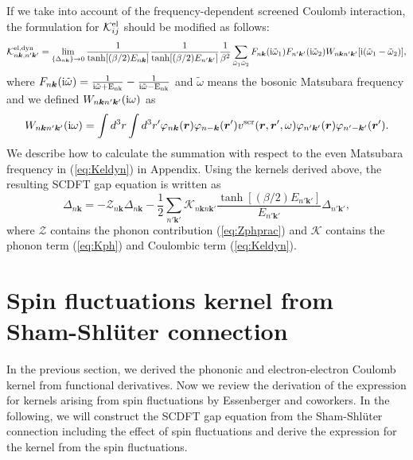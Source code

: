 %
If we take into account of the frequency-dependent screened Coulomb interaction,
the formulation for ${\mathcal K}^{\rm el}_{ij}$ should be modified as follows\cite{ra2013}:
%
\begin{equation}
	{\mathcal K}^{\rm el, dyn}_{n\bm k,n'\bm k'} = 
	\lim_{\{\Delta_{n\bm k}\} \to 0}
	\frac{1}{\tanh[(\beta/2)E_{n\bm k}]}\frac{1}{\tanh[(\beta/2)E_{n'\bm k'}]}
	\frac{1}{\beta^2}
	\sum_{\tilde{\omega}_1\tilde{\omega}_2}
	F_{n\bm k}({\rm i}\tilde\omega_1)F_{n'\bm k'}({\rm i}\tilde\omega_2)
	W_{n\bm kn'\bm k'}[{\rm i}(\tilde\omega_1 - \tilde\omega_2)],
	\label{eq:Keldyn}
\end{equation}
%
where $F_{n\bm k}({\rm i}\tilde\omega) = 
\frac{1}{\rm i \tilde\omega + E_{n\bm k}}-\frac{1}{\rm i \tilde\omega - E_{n\bm k}}$
and $\tilde\omega$ means the bosonic Matsubara frequency and we defined 
$W_{n\bm kn'\bm k'}({\rm i}\omega)$ as 
%
\begin{equation}
	W_{n\bm kn'\bm k'}({\rm i}\omega) = 
	\int d^3r \int d^3r' \varphi_{n\bm k}(\bm r)\varphi_{n-\bm k}({\bm r'})
	v^{\rm scr}(\bm r, {\bm r'}, \omega) \varphi_{n'\bm k'}(\bm r) \varphi_{n'-\bm k'}({\bm r'}).
	\label{eq:dynWnknk}
\end{equation}
%
We describe how to calculate the summation with respect to the even Matsubara frequency in (\ref{eq:Keldyn})
in Appendix.
Using the kernels derived above, the resulting SCDFT gap equation is written as
%
\begin{equation}
	\Delta_{n\bm k} = -{\mathcal Z}_{n \bm k}\Delta_{n\bm k} - \frac{1}{2}
	\sum_{n'\bm k'}{\mathcal K}_{n\bm k n \bm k'}
	\frac{\tanh[(\beta/2)E_{n' \bm k'}]}{E_{n' \bm k'}}\Delta_{n' \bm k'},
	\label{eq:truegapeq}
\end{equation}
%
where $\mathcal Z$ contains the phonon contribution (\ref{eq:Zphprac}) and $\mathcal K$ contains 
the phonon term (\ref{eq:Kph}) and Coulombic term (\ref{eq:Keldyn}).
\section{Spin fluctuations kernel from Sham-Shl\"{u}ter connection}
In the previous section, we derived the phononic and 
electron-electron Coulomb kernel from functional derivatives.
Now we review the derivation of the expression for kernels arising 
from spin fluctuations by Essenberger and coworkers\cite{Essenberger2014}.
In the following, we will construct the SCDFT gap equation from the Sham-Shl\"{u}ter connection
including the effect of spin fluctuations and derive the expression for the kernel from the spin fluctuations.

